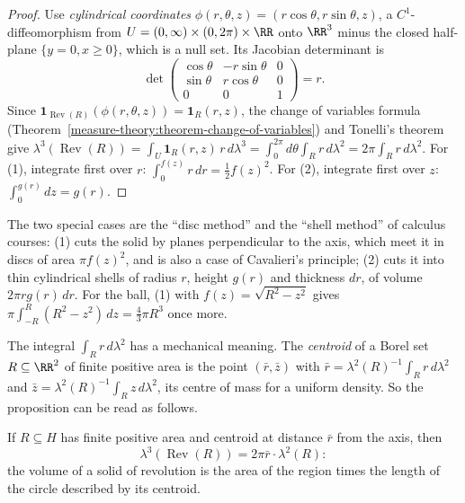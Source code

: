\begin{proof}
Use \emph{cylindrical coordinates} $\phi(r, \theta, z) = (r\cos\theta, r\sin\theta, z)$, a $C^1$-diffeomorphism from $U = (0, \infty) \times (0, 2\pi) \times \RR$ onto $\RR^3$ minus the closed half-plane $\{y = 0, x \geq 0\}$,
which is a null set. Its Jacobian determinant is
\[
\det\begin{pmatrix}\cos\theta & -r\sin\theta & 0\\ \sin\theta & r\cos\theta & 0\\ 0 & 0 & 1\end{pmatrix} = r .
\]
Since $\mathbf{1}_{\operatorname{Rev}(R)}(\phi(r, \theta, z)) = \mathbf{1}_R(r, z)$, the change of variables formula (Theorem~\ref{measure-theory:theorem-change-of-variables}) and Tonelli's theorem give
$\lambda^3(\operatorname{Rev}(R)) = \int_U\mathbf{1}_R(r, z)\,r\,d\lambda^3 = \int_0^{2\pi}d\theta\int_Rr\,d\lambda^2 = 2\pi\int_Rr\,d\lambda^2$. For (1), integrate first over $r$: $\int_0^{f(z)}r\,dr = \frac12f(z)^2$. For
(2), integrate first over $z$: $\int_0^{g(r)}dz = g(r)$.
\end{proof}

The two special cases are the ``disc method'' and the ``shell method'' of calculus courses: (1) cuts the solid by planes perpendicular to the axis, which meet it in discs of area $\pi f(z)^2$, and is
also a case of Cavalieri's principle; (2) cuts it into thin cylindrical shells of radius $r$, height $g(r)$ and thickness $dr$, of volume $2\pi rg(r)\,dr$. For the ball, (1) with $f(z) = \sqrt{R^2 - z^2}$
gives $\pi\int_{-R}^R(R^2 - z^2)\,dz = \frac43\pi R^3$ once more.

The integral $\int_Rr\,d\lambda^2$ has a mechanical meaning. The \emph{centroid} of a Borel set $R \subseteq \RR^2$ of finite positive area is the point $(\bar r, \bar z)$ with
$\bar r = \lambda^2(R)^{-1}\int_Rr\,d\lambda^2$ and $\bar z = \lambda^2(R)^{-1}\int_Rz\,d\lambda^2$, its centre of mass for a uniform density. So the proposition can be read as follows.

\begin{corollary}\label{measure-theory:corollary-pappus-volume}
If $R \subseteq H$ has finite positive area and centroid at distance $\bar r$ from the axis, then
\[
\lambda^3(\operatorname{Rev}(R)) = 2\pi\bar r \cdot \lambda^2(R):
\]
the volume of a solid of revolution is the area of the region times the length of the circle described by its centroid.
\end{corollary}

